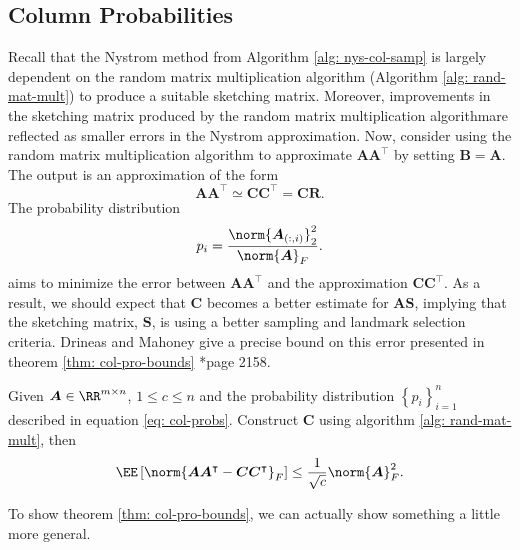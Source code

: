 \subsection{Column Probabilities}\label{Section2.2}

Recall that the Nystrom method from Algorithm \ref{alg: nys-col-samp} is largely dependent on the random matrix multiplication algorithm (Algorithm \ref{alg: rand-mat-mult}) to produce a suitable sketching matrix. Moreover, improvements in the sketching matrix produced by the random matrix multiplication algorithmare reflected as smaller errors in the Nystrom approximation. Now, consider using the random matrix multiplication algorithm to approximate $\bm{A} \bm{A}^{\intercal}$ by setting $\bm{B} = \bm{A}$. The output is an approximation of the form
\begin{equation*}
    \bm{A} \bm{A}^{\intercal} \simeq \bm{C} \bm{C}^{\intercal} = \bm{C} \bm{R}.
\end{equation*}
The probability distribution
\begin{equation*} \label{eq: col-probs}
    p_i = \frac{\norm{\bm{A}_{(:,i)}}_2^2}{\norm{\bm{A}}_F}.
\end{equation*}
aims to minimize the error between $\bm{A} \bm{A}^{\intercal}$ and the approximation $\bm{C} \bm{C}^{\intercal}$. As a result, we should expect that $\bm{C}$ becomes a better estimate for $\bm{A} \bm{S}$, implying that the sketching matrix, $\bm{S}$, is using a better sampling and landmark selection criteria. Drineas and Mahoney give a precise bound on this error presented in theorem \ref{thm: col-pro-bounds} \cite{JMLR:v6:drineas05a}*{page 2158}.

\begin{thm} \label{thm: col-pro-bounds}
    Given $\bm{A} \in \RR^{m \times n}$, $1 \leq c \leq n$ and the probability distribution $\left\{ p_i \right\}_{i=1}^{n}$ described in equation \ref{eq: col-probs}. Construct $\bm{C}$ using algorithm \ref{alg: rand-mat-mult}, then
    \[
        \EE \left[ \norm{\bm{A} \bm{A}^{\intercal} - \bm{C} \bm{C}^{\intercal}}_{F} \right] \leq \frac{1}{\sqrt{c}} \norm{\bm{A}}^2_{F}.
    \]
\end{thm}

To show theorem \ref{thm: col-pro-bounds}, we can actually show something a little more general.